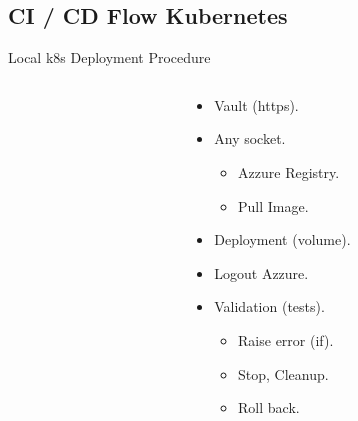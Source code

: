 \subsection{CI / CD Flow Kubernetes}

\begin{frame}{Local k8s Deployment Procedure}
	\begin{columns}[T] %
		\begin{column}{5cm} %
		\end{column}
		\begin{column}{5cm} %
			\begin{itemize}
				\item<+-| alert@+> Vault (https).
				\item<+-| alert@+> Any socket.
					\begin{itemize}
						\item<+-| alert@+> Azzure Registry.
						\item<+-| alert@+> Pull Image.
					\end{itemize}
				\item<+-| alert@+> Deployment (volume).
				\item<+-| alert@+> Logout Azzure.
				\item<+-| alert@+> Validation (tests).
					\begin{itemize}
						\item<+-| alert@+>Raise error (if).
						\item<+-| alert@+> Stop, Cleanup.
						\item<+-| alert@+> Roll back.
					\end{itemize}
			\end{itemize}
		\end{column}
	\end{columns}
\end{frame}

